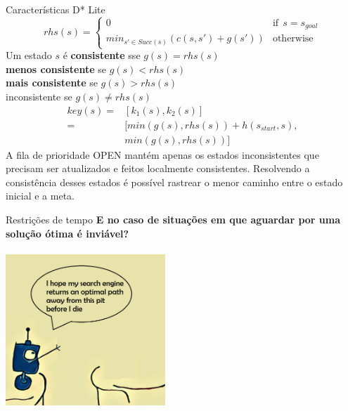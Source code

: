 \documentclass[10pt]{beamer}
\begin{document}
\begin{frame}{Características D* Lite}
\begin{equation*}
  rhs(s) =
    \begin{cases}
      0 & \text{if}\:\: s = s_{goal}\\
      min_{s' \in Succ(s)}(c(s,s') + g(s')) & \text{otherwise}
    \end{cases}       
\end{equation*}
Um estado $s$ é \textbf{consistente} sse $g(s) = rhs(s)$\\
\hspace*{2.2cm} \textbf{menos consistente} se $g(s) < rhs(s)$\\
\hspace*{2.2cm} \textbf{mais consistente} se $g(s) > rhs(s)$ \\
\hspace*{2.2cm} \alert{inconsistente} se $g(s) \neq rhs(s)$
\begin{equation*}
\begin{aligned}
key(s) ={} & [k_1(s), k_2(s)] \\
      ={} & [min(g(s), rhs(s)) + h(s_{start}, s), \\
      & min(g(s), rhs(s))] 
\end{aligned}
\end{equation*}
A fila de prioridade OPEN mantém apenas os estados inconsistentes que precisam ser atualizados e feitos localmente consistentes. Resolvendo a consistência desses estados é possível rastrear o menor caminho entre o estado inicial e a meta.
\end{frame}
\begin{frame}{Restrições de tempo}
\textbf{E no caso de situações em que aguardar por uma solução ótima é inviável?} 
\begin{center}
\includegraphics[width=6cm,height=6cm]{robby.png}
\end{center}
\end{frame}
\end{document}
